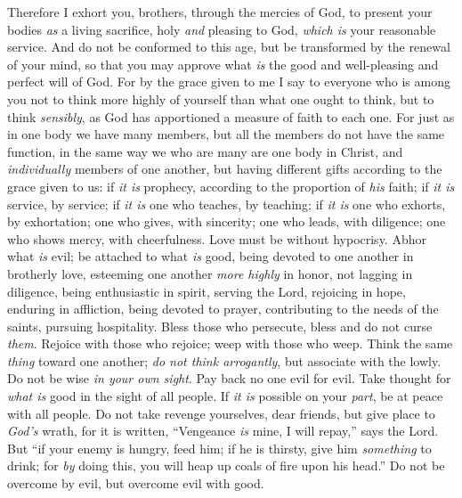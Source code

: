 \begin{biblechapter} %
 Therefore I exhort you, brothers, through the mercies of God, to present your bodies \textit{as} a living sacrifice, holy \textit{and} pleasing to God, \textit{which is} your reasonable service.
\verse And do not be conformed to this age, but be transformed by the renewal of your mind, so that you may approve what \textit{is} the good and well-pleasing and perfect will of God.
 For by the grace given to me I say to everyone who is among you not to think more highly of yourself than what one ought to think, but to think \textit{sensibly}, as God has apportioned a measure of faith to each one.
\verse For just as in one body we have many members, but all the members do not have the same function,
\verse in the same way we who are many are one body in Christ, and \textit{individually} members of one another,
\verse but having different gifts according to the grace given to us: if \textit{it is} prophecy, according to the proportion of \textit{his} faith;
\verse if \textit{it is} service, by service; if \textit{it is} one who teaches, by teaching;
\verse if \textit{it is} one who exhorts, by exhortation; one who gives, with sincerity; one who leads, with diligence; one who shows mercy, with cheerfulness.
 Love must be without hypocrisy. Abhor what \textit{is} evil; be attached to what \textit{is} good,
\verse being devoted to one another in brotherly love, esteeming one another \textit{more highly} in honor,
\verse not lagging in diligence, being enthusiastic in spirit, serving the Lord,
\verse rejoicing in hope, enduring in affliction, being devoted to prayer,
\verse contributing to the needs of the saints, pursuing hospitality.
\verse Bless those who persecute, bless and do not curse \textit{them}.
\verse Rejoice with those who rejoice; weep with those who weep.
\verse Think the same \textit{thing} toward one another; \textit{do not think arrogantly}, but associate with the lowly. Do not be wise \textit{in your own sight}.
\verse Pay back no one evil for evil. Take thought for \textit{what is} good in the sight of all people.
\verse If \textit{it is} possible on your \textit{part}, be at peace with all people.
\verse Do not take revenge yourselves, dear friends, but give place to \textit{God’s} wrath, for it is written, “Vengeance \textit{is} mine, I will repay,” says the Lord.
\verse But “if your enemy is hungry, feed him; if he is thirsty, give him \textit{something} to drink; for \textit{by} doing this, you will heap up coals of fire upon his head.”
\verse Do not be overcome by evil, but overcome evil with good.
\end{biblechapter}

